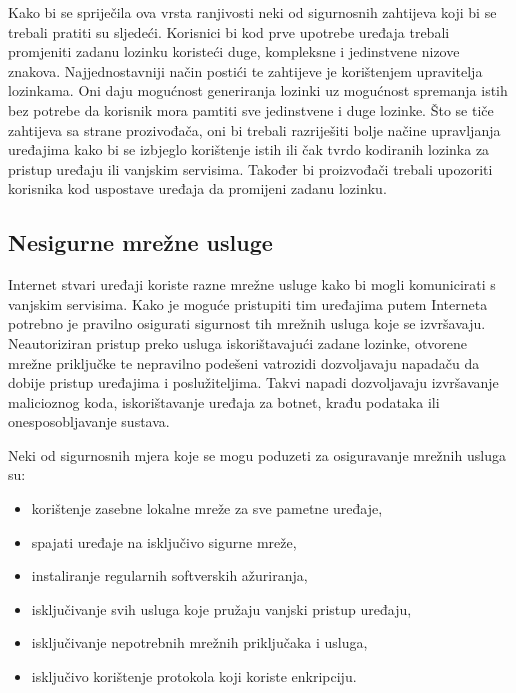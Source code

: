 \documentclass[times, utf8, diplomski]{fer}
\begin{document}
Kako bi se spriječila ova vrsta ranjivosti neki od sigurnosnih zahtijeva koji bi se trebali pratiti su sljedeći. Korisnici bi kod prve upotrebe uređaja trebali promjeniti zadanu lozinku koristeći duge, kompleksne i jedinstvene nizove znakova. Najjednostavniji način postići te zahtijeve je korištenjem upravitelja lozinkama. Oni daju mogućnost generiranja lozinki uz mogućnost spremanja istih bez potrebe da korisnik mora pamtiti sve jedinstvene i duge lozinke. Što se tiče zahtijeva sa strane prozivođača, oni bi trebali razriješiti bolje načine upravljanja uređajima kako bi se izbjeglo korištenje istih ili čak tvrdo kodiranih lozinka za pristup uređaju ili vanjskim servisima. Također bi proizvođači trebali upozoriti korisnika kod uspostave uređaja da promijeni zadanu lozinku.

\subsection{Nesigurne mrežne usluge}
Internet stvari uređaji koriste razne mrežne usluge kako bi mogli komunicirati s vanjskim servisima. Kako je moguće pristupiti tim uređajima putem Interneta potrebno je pravilno osigurati sigurnost tih mrežnih usluga koje se izvršavaju. Neautoriziran pristup preko usluga iskorištavajući zadane lozinke, otvorene mrežne priključke te nepravilno podešeni vatrozidi dozvoljavaju napadaču da dobije pristup uređajima i poslužiteljima. Takvi napadi dozvoljavaju izvršavanje malicioznog koda, iskorištavanje uređaja za botnet, krađu podataka ili onesposobljavanje sustava.

Neki od sigurnosnih mjera koje se mogu poduzeti za osiguravanje mrežnih usluga su: \begin{itemize}
    \item korištenje zasebne lokalne mreže za sve pametne uređaje,
    \item spajati uređaje na isključivo sigurne mreže,
    \item instaliranje regularnih softverskih ažuriranja,
    \item isključivanje svih usluga koje pružaju vanjski pristup uređaju,
    \item isključivanje nepotrebnih mrežnih priključaka i usluga,
    \item isključivo korištenje protokola koji koriste enkripciju.
\end{itemize}
\end{document}
